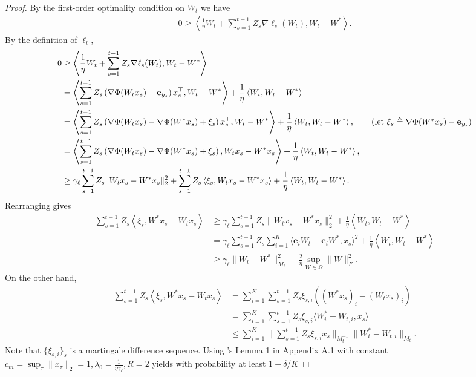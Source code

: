 \documentclass{article}
\newcommand{\nb}{\nabla}
\newcommand{\e}{\mathbf{e}}
\newcommand{\inner}[1]{ \left\langle {#1} \right\rangle }
\begin{document}
\begin{proof}
By the first-order optimality condition on $W_{t}$ we have
\begin{align*}
    0\geq \inner{\frac{1}{\eta} W_{t} + \sum_{s=1}^{t-1} Z_s\nb\ell_s(W_t), W_{t}-W^*}. 
\end{align*}
By the definition of $\ell_t$, 
\begin{align*}
    0 &\geq \inner{\frac{1}{\eta} W_{t} + \sum_{s=1}^{t-1} Z_s\nb\ell_s(W_t),  W_{t}-W^*} \\
    & = \inner{\sum_{s=1}^{t-1} Z_s\left(\nb\Phi(W_t x_s) - \e_{y_s} \right)x_s^\top,  W_{t}-W^*} + \frac{1}{\eta}\inner{W_t, W_t-W^*} \\
    & = \inner{\sum_{s=1}^{t-1} Z_s\left(\nb\Phi(W_t x_s) - \nb\Phi(W^*x_s) + \xi_s \right)x_s^\top, W_{t}-W^*} + \frac{1}{\eta}\inner{W_t, W_t-W^*} , \tag{let $\xi_s\triangleq \nb\Phi(W^*x_s)-\e_{y_s}$} \\ 
    & = \inner{\sum_{s=1}^{t-1} Z_s\left(\nb\Phi(W_t x_s) - \nb\Phi(W^*x_s) + \xi_s \right), W_t x_s- W^*x_s} + \frac{1}{\eta}\inner{W_t, W_t-W^*}, \\
    & \geq \gamma_\ell \sum_{s=1}^{t-1} Z_s\|W_tx_s-W^*x_s\|_2^2 + \sum_{s=1}^{t-1} Z_s\inner{\xi_s, W_tx_s-W^*x_s} + \frac{1}{\eta} \inner{W_t, W_t-W^*}. 
\end{align*}
Rearranging gives 
\begin{align}
    \sum_{s=1}^{t-1} Z_s\inner{\xi_s, W^*x_s-W_tx_s} &\geq \gamma_\ell \sum_{s=1}^{t-1} Z_s\|W_tx_s-W^*x_s\|_2^2 + \frac{1}{\eta} \inner{W_t, W_t-W^*} \nonumber \\
    &= \gamma_\ell \sum_{s=1}^{t-1} Z_s\sum_{i=1}^K \langle \e_iW_t-\e_iW^*, x_s\rangle^2 + \frac{1}{\eta} \inner{W_t, W_t-W^*} \nonumber \\
    & \geq \gamma_\ell \|W_t-W^*\|_{M_t}^2 - \frac{2}{\eta} \sup_{W\in \Omega}\|W\|_F^2.  \label{eqn:lower}
\end{align}
On the other hand, 
\begin{align}
    \sum_{s=1}^{t-1} Z_s\inner{\xi_s, W^*x_s-W_tx_s} &= \sum_{i=1}^K  \sum_{s=1}^{t-1} Z_s\xi_{s,i} ((W^*x_s)_i-(W_tx_s)_i) \nonumber \\
    & = \sum_{i=1}^K  \sum_{s=1}^{t-1} Z_s\xi_{s,i} \langle W^*_i-W_{t,i}, x_s\rangle \nonumber \\
    &\leq \sum_{i=1}^K \Bigg\| \sum_{s=1}^{t-1} Z_s\xi_{s,i}x_s \Bigg\|_{M_t^{-1}} \|W^*_i-W_{t,i}\|_{M_t}.   \label{eqn:upper}
\end{align}
Note that $\{\xi_{s,i}\}_{s}$ is a martingale difference sequence. Using \cite{filippi2010parametric}'s Lemma 1 in Appendix A.1 with constant $c_m = \sup_\tau\|x_\tau\|_2=1, \lambda_0 = \frac{1}{\eta\gamma_\ell}, R=2$ yields with probability at least $1-\delta/K$

\end{proof}
\end{document}
